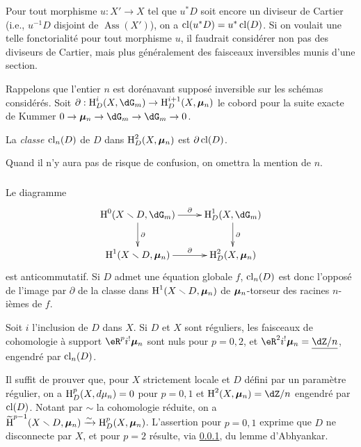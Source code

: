 Pour tout morphisme $u:X'\to X$ tel que $u^* D$ soit encore un diviseur de 
Cartier (i.e., $u^{-1} D$ disjoint de $\operatorname{Ass}(X')$), on a 
$\operatorname{cl}(u^* D) = u^*\operatorname{cl}(D)$. Si on voulait une telle 
fonctorialité pour tout morphisme $u$, il faudrait considérer non pas des 
diviseurs de Cartier, mais plus généralement des faisceaux inversibles 
munis d'une section.

Rappelons que l'entier $n$ est dorénavant supposé inversible sur les 
schémas considérés. Soit 
$\partial:\h_D^i(X,\dG_m) \to \h_D^{i+1}(X,\dmu_n)$ le cobord pour la suite 
exacte de Kummer $0 \to \dmu_n \to \dG_m \to \dG_m \to 0$.





\begin{definition}\label{IV:2-1-2}
La \emph{classe $\operatorname{cl}_n(D)$} de $D$ dans $\operatorname{H}_D^2(X,{\bm\mu}_n)$ est 
$\partial \operatorname{cl}(D)$. 
\end{definition}

Quand il n'y aura pas de risque de confusion, on omettra la mention de $n$. 





\subsubsection{}\label{IV:2-1-3}

Le diagramme 
\[\xymatrix{
  \h^0(X\setminus D,\dG_m) \ar[r]^-\partial \ar[d]^-\partial 
    & \h_D^1(X,\dG_m) \ar[d]^-\partial \\
  \h^1(X\setminus D,\dmu_n) \ar[r]^-\partial 
    & \h_D^2(X,\dmu_n)
}\]
est anticommutatif. Si $D$ admet une équation globale $f$, 
$\operatorname{cl}_n(D)$ est donc l'opposé de l'image par $\partial$ de la 
classe dans $\operatorname{H}^1(X\smallsetminus D,{\bm\mu}_n)$ de ${\bm\mu}_n$-torseur des racines 
$n$-ièmes de $f$. 





\begin{proposition}\label{IV:2-1-4}
Soit $i$ l'inclusion de $D$ dans $X$. Si $D$ et $X$ sont réguliers, les 
faisceaux de cohomologie à support $\eR^p i^! \dmu_n$ sont nuls pour $p=0,2$, 
et $\eR^2 i^!\dmu_n = \underline{\dZ/n}$, engendré par 
$\operatorname{cl}_n(D)$. 
\end{proposition}

Il suffit de prouver que, pour $X$ strictement locale et $D$ défini par un 
paramètre régulier, on a $\operatorname{H}_D^p(X,d\mu_n) = 0$ pour $p=0,1$ et 
$\h^2(X,\dmu_n) = \dZ/n$ engendré par $\operatorname{cl}(D)$. Notant par 
$\sim$ la cohomologie réduite, on a 
$\widetilde{\operatorname{H}}^{p-1}(X\smallsetminus D,{\bm\mu}_n)\xrightarrow\sim \operatorname{H}_D^p(X,{\bm\mu}_n)$. L'assertion 
pour $p=0,1$ exprime que $D$ ne disconnecte par $X$, et pour $p=2$ résulte, 
via \ref{IV:2-1-3}, du lemme d'Abhyankar. 

